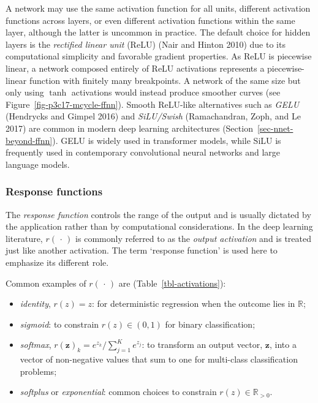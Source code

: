 \documentclass[
  letterpaper,
  krantz2]{style/krantz}
\providecommand{\tightlist}{%
  \setlength{\itemsep}{0pt}\setlength{\parskip}{0pt}}
\begin{document}
A network may use the same activation function for all units, different
activation functions across layers, or even different activation
functions within the same layer, although the latter is uncommon in
practice. The default choice
for hidden layers is the \emph{rectified linear unit} (ReLU) (Nair and
Hinton 2010) due to its computational simplicity and favorable gradient
properties. As ReLU is piecewise linear, a network composed entirely of
ReLU activations represents a piecewise-linear function with finitely
many breakpoints. A
network of the same size but only using \(\tanh\) activations would
instead produce smoother curves (see
Figure~\ref{fig-p3c17-mcycle-ffnn}).
 Smooth
ReLU-like alternatives such as \emph{GELU} (Hendrycks and Gimpel 2016)
and \emph{SiLU/Swish} (Ramachandran, Zoph, and Le 2017) are common in
modern deep learning architectures (Section~\ref{sec-nnet-beyond-ffnn}).
GELU is widely used in transformer models, while SiLU is frequently used
in contemporary convolutional neural networks and large language
models.

\subsubsection{Response functions}\label{response-functions}

The \emph{response function} controls the range of the output and is
usually dictated by the application rather than by computational
considerations. In the deep
learning literature, \(r(\,\cdot\,)\) is commonly referred to as the
\emph{output activation} and is treated just like another activation.
The term `response function' is used here to emphasize its different
role.

Common examples of \(r(\,\cdot\,)\) are (Table~\ref{tbl-activations}):

\begin{itemize}
\tightlist
\item
  \emph{identity}, \(r(z) = z\): for deterministic regression when the
  outcome lies in
  \(\mathbb{R}\);
\item
  \emph{sigmoid}: to constrain \(r(z) \in (0,1)\) for binary
  classification;
\item
  \emph{softmax}, \(r(\mathbf{z})_k = e^{z_k}/\sum_{j=1}^{K}e^{z_j}\):
  to transform an output vector, \(\mathbf{z}\), into a vector of
  non-negative values that sum to one for multi-class classification
  problems;
\item
  \emph{softplus} or \emph{exponential}: common choices to constrain
  \(r(z) \in \mathbb{R}_{>0}\).
\end{itemize}
\end{document}
